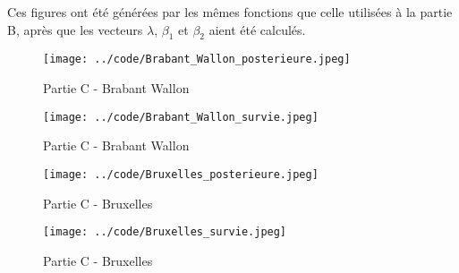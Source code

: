 \documentclass{article}
\begin{document}
Ces figures ont été générées par les mêmes fonctions que celle utilisées à la partie B, après que les vecteurs $\lambda$, $\beta_{1}$ et $\beta_{2}$ aient été calculés.

\begin{figure}[!h]
   \begin{minipage}[c]{.46\linewidth}
	\texttt{[image: ../code/Brabant\_Wallon\_posterieure.jpeg]}
	\caption{Partie C - Brabant Wallon}
   \end{minipage} \hfill
   \begin{minipage}[c]{.46\linewidth}
	\texttt{[image: ../code/Brabant\_Wallon\_survie.jpeg]}
	\caption{Partie C - Brabant Wallon }
   \end{minipage}
\end{figure}

\begin{figure}[!h]
   \begin{minipage}[c]{.46\linewidth}
	\texttt{[image: ../code/Bruxelles\_posterieure.jpeg]}
	\caption{Partie C - Bruxelles}
   \end{minipage} \hfill
   \begin{minipage}[c]{.46\linewidth}
	\texttt{[image: ../code/Bruxelles\_survie.jpeg]}
	\caption{Partie C - Bruxelles}
   \end{minipage}
\end{figure}
\end{document}

